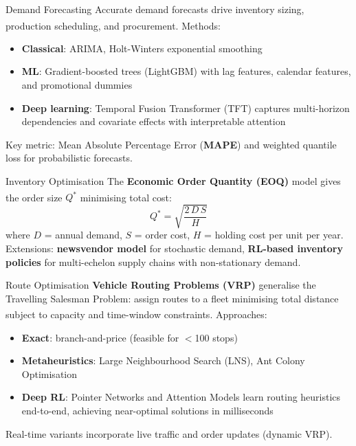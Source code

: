 \begin{v3topic}{Demand Forecasting}
    Accurate demand forecasts drive inventory sizing, production scheduling, and procurement\textsuperscript{\cite[][pp.~1--5]{mahmoodInternetThingsIndustrial2019}}.
    Methods:
    \begin{itemize}
        \item \textbf{Classical}: ARIMA, Holt-Winters exponential smoothing
        \item \textbf{ML}: Gradient-boosted trees (LightGBM) with lag features, calendar features, and promotional dummies
        \item \textbf{Deep learning}: Temporal Fusion Transformer (TFT) captures multi-horizon dependencies and covariate effects with interpretable attention
    \end{itemize}
    Key metric: Mean Absolute Percentage Error (\textbf{MAPE}) and weighted quantile loss for probabilistic forecasts.

\end{v3topic}
\begin{v3topic}{Inventory Optimisation}
    The \textbf{Economic Order Quantity (EOQ)} model gives the order size $Q^*$ minimising total cost\textsuperscript{\cite[][pp.~8--12]{mahmoodInternetThingsIndustrial2019}}:
    \begin{equation}
        Q^* = \sqrt{\frac{2\,D\,S}{H}}
    \end{equation}
    where $D$ = annual demand, $S$ = order cost, $H$ = holding cost per unit per year.
    Extensions: \textbf{newsvendor model} for stochastic demand, \textbf{RL-based inventory policies} for multi-echelon supply chains with non-stationary demand.

\end{v3topic}
\begin{v3topic}{Route Optimisation}
    \textbf{Vehicle Routing Problems (VRP)} generalise the Travelling Salesman Problem: assign routes to a fleet minimising total distance subject to capacity and time-window constraints\textsuperscript{\cite[][pp.~12--18]{mahmoodInternetThingsIndustrial2019}}.
    Approaches:
    \begin{itemize}
        \item \textbf{Exact}: branch-and-price (feasible for $<$100 stops)
        \item \textbf{Metaheuristics}: Large Neighbourhood Search (LNS), Ant Colony Optimisation
        \item \textbf{Deep RL}: Pointer Networks and Attention Models learn routing heuristics end-to-end, achieving near-optimal solutions in milliseconds
    \end{itemize}
    Real-time variants incorporate live traffic and order updates (dynamic VRP).
\end{v3topic}

